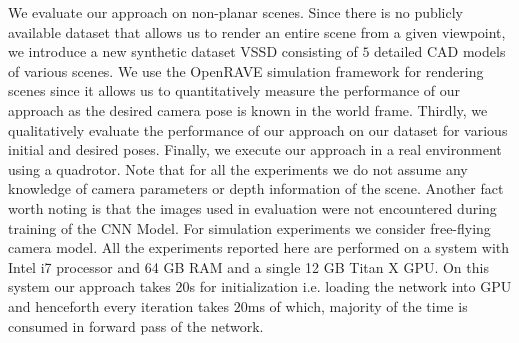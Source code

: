 \documentclass[usletter, 10 pt, conference]{ieeeconf}  %
\begin{document}
 We evaluate our approach on non-planar scenes. Since there is no publicly available dataset that allows us to render an entire scene from a given viewpoint, we introduce a new synthetic dataset VSSD consisting of $5$ detailed CAD models of various scenes. We use the OpenRAVE simulation framework \cite{openrave} for rendering scenes since it  allows us to quantitatively measure the performance of our approach as the desired camera pose is known in the world frame. Thirdly, we qualitatively evaluate the performance of our approach on our dataset for various initial and desired poses. Finally, we execute our approach in a real environment using a quadrotor. Note that for all the experiments we do not assume any knowledge of camera parameters or depth information of the scene. Another fact worth noting is that the images used in evaluation were not encountered during training of the CNN Model. For simulation experiments we consider free-flying camera model. All the experiments reported here are performed on a system with Intel i7 processor and 64 GB RAM and a single 12 GB Titan X GPU. On this system our approach takes $20$s for initialization i.e. loading the network into GPU and henceforth every iteration takes $20$ms of which, majority of the time is consumed in forward pass of the network.  %

\end{document}
